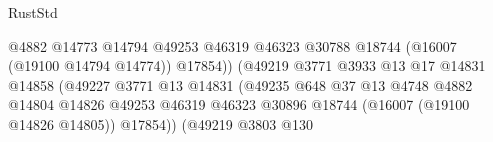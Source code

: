 \begin{lexlean}{RustStd}
\begin{coremodule}
                                                            @4882
                                                            @14773
                                                            @14794
                                                            @49253
                                                            @46319
                                                            @46323
                                                            @30788
                                                            @18744
                                                            (@16007 (@19100 @14794 @14774))
                                                            @17854))
                                                        (@49219
                                                          @3771
                                                          @3933
                                                          @13
                                                          @17
                                                          @14831
                                                          @14858
                                                          (@49227
                                                            @3771
                                                            @13
                                                            @14831
                                                            (@49235
                                                              @648
                                                              @37
                                                              @13
                                                              @4748
                                                              @4882
                                                              @14804
                                                              @14826
                                                              @49253
                                                              @46319
                                                              @46323
                                                              @30896
                                                              @18744
                                                              (@16007 (@19100 @14826 @14805))
                                                              @17854))
                                                          (@49219
                                                            @3803
                                                            @130

\end{coremodule}
\end{lexlean}
